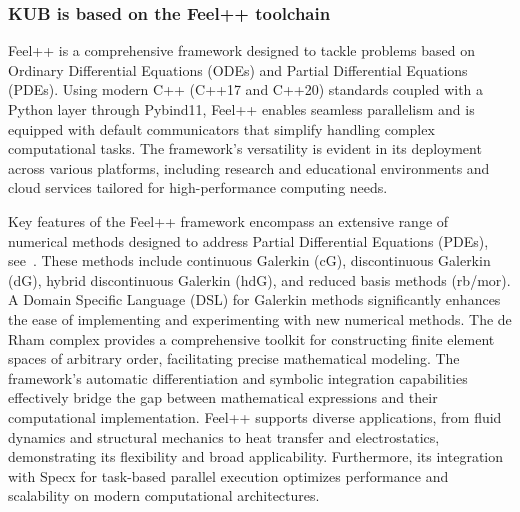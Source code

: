 \documentclass[runningheads]{llncs}
\begin{document}
\subsubsection{KUB is based on the Feel++ toolchain}

Feel++ is a comprehensive framework designed to tackle problems based on Ordinary Differential Equations (ODEs) and Partial Differential Equations (PDEs). Using modern C++ (C++17 and C++20) standards coupled with a Python layer through Pybind11, Feel++ enables seamless parallelism and is equipped with default communicators that simplify handling complex computational tasks. The framework's versatility is evident in its deployment across various platforms, including research and educational environments and cloud services tailored for high-performance computing needs.

Key features of the Feel++ framework encompass an extensive range of numerical methods designed to address Partial Differential Equations (PDEs), see~\cite{christophe_prudhomme_feelppfeelpp_2024}. These methods include continuous Galerkin (cG), discontinuous Galerkin (dG), hybrid discontinuous Galerkin (hdG), and reduced basis methods (rb/mor). A Domain Specific Language (DSL) for Galerkin methods significantly enhances the ease of implementing and experimenting with new numerical methods. The de Rham complex provides a comprehensive toolkit for constructing finite element spaces of arbitrary order, facilitating precise mathematical modeling. The framework's automatic differentiation and symbolic integration capabilities effectively bridge the gap between mathematical expressions and their computational implementation. Feel++ supports diverse applications, from fluid dynamics and structural mechanics to heat transfer and electrostatics, demonstrating its flexibility and broad applicability. Furthermore, its integration with Specx for task-based parallel execution optimizes performance and scalability on modern computational architectures.

\end{document}
